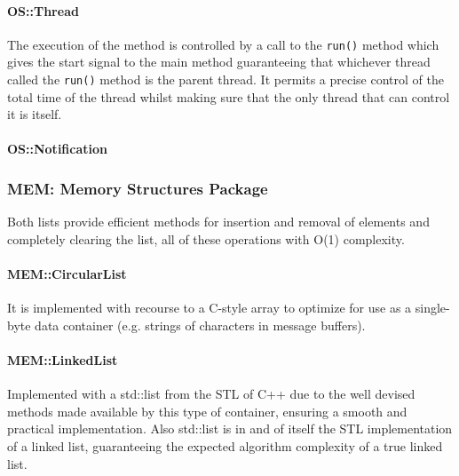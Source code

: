 

\paragraph{OS::Thread}
The execution of the method is controlled by a call to the \texttt{run()} method which gives the start signal to the main method guaranteeing that whichever thread called the \texttt{run()} method is the parent thread. It permits a precise control of the total time of the thread whilst making sure that the only thread that can control it is itself.
%


\paragraph{OS::Notification}



\subsubsection{MEM: Memory Structures Package}

Both lists provide efficient methods for insertion and removal of elements and completely clearing the list, all of these operations with O(1) complexity.

\paragraph{MEM::CircularList}
It is implemented with recourse to a C-style array to optimize for use as a single-byte data container (e.g. strings of characters in message buffers).



\paragraph{MEM::LinkedList}
Implemented with a std::list from the STL of C++ due to the well devised methods made available by this type of container, ensuring a smooth and practical implementation. Also std::list is in and of itself the STL implementation of a linked list, guaranteeing the expected algorithm complexity of a true linked list.

